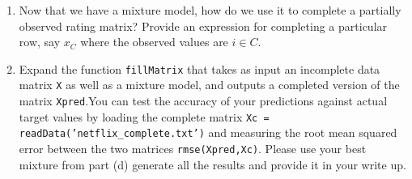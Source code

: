 \begin{enumerate}
\begin{enumerate}
\item Now that we have a mixture model, how do we use it to complete a partially observed rating matrix? Provide an expression for completing a particular row, say $x_C$ where the observed values are $i\in C$. 

\item Expand the function \texttt{fillMatrix} that takes as input an incomplete data matrix \texttt{X} as well as a mixture model, and outputs a completed version of the matrix \texttt{Xpred}.You can test the accuracy of your predictions against actual target values by loading the complete matrix \texttt{Xc = readData('netflix\_complete.txt')} and measuring the root mean squared error between the two matrices \texttt{rmse(Xpred,Xc)}. Please use your best mixture from part (d) generate all the results and provide it in your write up. 

\end{enumerate}

\end{enumerate}






